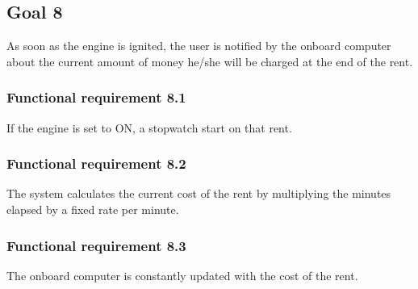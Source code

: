 \subsection{Goal 8}
As soon as the engine is ignited, the user is notified by the onboard computer about the current amount of money he/she will be charged at the end of the rent.
\setcounter{secnumdepth}{3}
\subsubsection{Functional requirement 8.1}
If the engine is set to ON, a stopwatch start on that rent.

\subsubsection{Functional requirement 8.2}
The system calculates the current cost of the rent by multiplying the minutes elapsed by a fixed rate per minute.

\subsubsection{Functional requirement 8.3}
The onboard computer is constantly updated with the cost of the rent.